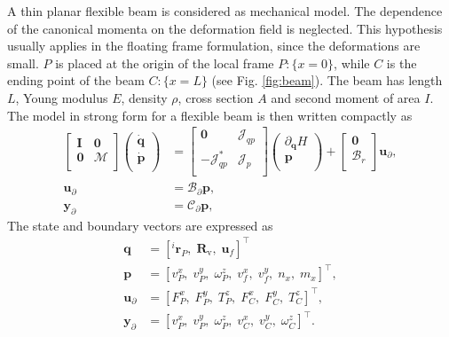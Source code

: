 A thin planar flexible beam is considered as mechanical model. The dependence of the canonical momenta on the deformation field is neglected. This hypothesis usually applies in the floating frame formulation, since the deformations are small. $P$ is placed at the origin of the local frame $P:\{x=0\}$, while $C$ is the ending point of the beam $C:\{x=L\}$ (see Fig. \ref{fig:beam}). The beam has length $L$, Young modulus $E$, density $\rho$, cross section $A$ and second moment of area $I$. The model in strong form for a flexible beam is then written compactly as 
\begin{equation}
\label{eq:EB_str_phdae}
\begin{aligned}
\begin{bmatrix}
\bm{I} & \bm{0} \\
\bm{0} & \mathcal{M} \\
\end{bmatrix}
\begin{pmatrix}
\dot{\bm{q}} \\
\dot{\bm{p}} \\
\end{pmatrix}
&= \begin{bmatrix}
\bm{0} & {\mathcal{J}}_{qp} \\
-{\mathcal{J}}_{qp}^* & {\mathcal{J}}_p \\
\end{bmatrix}
\begin{pmatrix}
\partial_{\bm{q}} H \\
\bm{p}  \\
\end{pmatrix} + 
\begin{bmatrix}
\bm{0} \\
{\mathcal{B}}_r \\
\end{bmatrix} \bm{u}_\partial, \\
\bm{u}_\partial &= {\mathcal{B}}_{\partial} \bm{p}, \\
\bm{y}_\partial &= {\mathcal{C}}_{\partial} \bm{p},
\end{aligned}
\end{equation}
The state and boundary vectors are expressed as
\begin{align*}
\bm{q} &= [^i\bm{r}_P, \; \bm{R}_{\text{v}}, \; \bm{u}_f]^\top \\
\bm{p} &= [v_P^x, \; v_P^y, \; \omega_P^z, \; v_f^x, \; v_f^y, \; n_x, \; m_{x}]^\top, \\
\bm{u}_\partial &=  [F_{P}^x, \; F_{P}^y, \; T_{P}^z, \; F_{C}^x, \; F_{C}^y, \; T_{C}^z]^\top, \\
\bm{y}_\partial &=  [v_{P}^x, \; v_{P}^y, \; \omega_{P}^z, \; v_{C}^x, \; v_{C}^y, \; \omega_{C}^z]^\top.
\end{align*}
